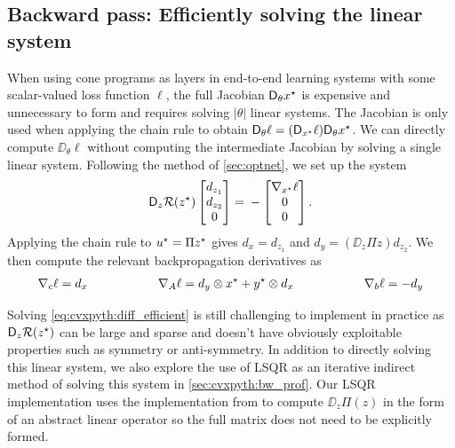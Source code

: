 \subsection{Backward pass: Efficiently solving the linear system}
When using cone programs as layers in end-to-end learning systems
with some scalar-valued loss function $\ell$,
the full Jacobian $\mathsf{D}_\theta {x^\star}$ is expensive
and unnecessary to form and requires solving
$|\theta|$ linear systems.
The Jacobian is only used when applying the chain rule
to obtain $\mathsf{D}_\theta \ell = (\mathsf{D}_{x^\star}\ell) \mathsf{D}_\theta {x^\star}$.
We can directly compute $\DD_\theta \ell$ without computing
the intermediate Jacobian by solving a single linear system.
Following the method of \cref{sec:optnet}, we set up the system
\begin{equation}
  \label{eq:cvxpyth:diff_efficient}
  \mathsf{D}_z \mathcal{R}({z^\star})
\begin{bmatrix}
  d_{z_1} \\
  d_{z_2} \\
  0 \\
\end{bmatrix} = \\
-
\begin{bmatrix}
  \nabla_{x^\star} \ell \\
  0 \\
  0 \\
\end{bmatrix}.
\end{equation}
Applying the chain rule to ${u^\star}=\Pi {z^\star}$ gives
$d_x = d_{z_1}$ and
$d_y = (\DD_z \Pi z) d_{z_2}$.
We then compute the relevant backpropagation derivatives as
\begin{equation}
  \nabla_c \ell = d_x
  \hspace{20mm}
  \nabla_A \ell = d_y \otimes \xstar + \ystar \otimes d_x
  \hspace{20mm}
  \nabla_b \ell = -d_y
\end{equation}

Solving \cref{eq:cvxpyth:diff_efficient} is still challenging
to implement in practice as $\mathsf{D}_z \mathcal{R}({z^\star})$ can be large
and sparse and doesn't have obviously exploitable properties such
as symmetry or anti-symmetry.
In addition to directly solving this linear system, we
also explore the use of LSQR \citep{paige1982lsqr} as an
iterative indirect method of solving this system
in \cref{sec:cvxpyth:bw_prof}.
Our LSQR implementation uses the implementation from
\citet{ali2017semismooth} to compute $\DD_z \Pi(z)$
in the form of an abstract linear operator so the
full matrix does not need to be explicitly formed.

